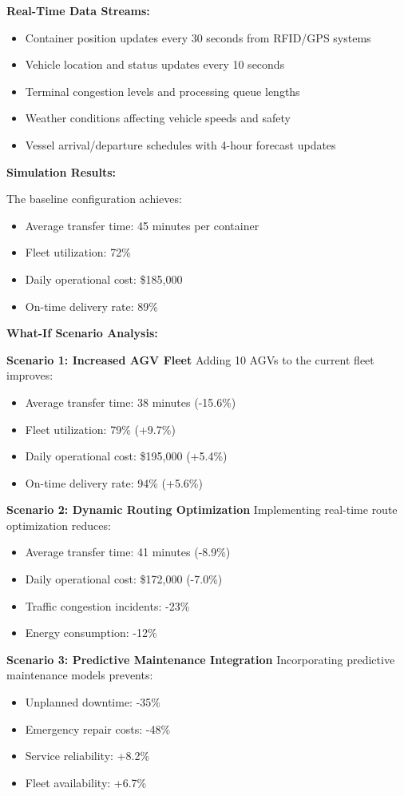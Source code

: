 \documentclass{article}
\begin{document}
\textbf{Real-Time Data Streams:}
\begin{itemize}
\item Container position updates every 30 seconds from RFID/GPS systems
\item Vehicle location and status updates every 10 seconds
\item Terminal congestion levels and processing queue lengths
\item Weather conditions affecting vehicle speeds and safety
\item Vessel arrival/departure schedules with 4-hour forecast updates
\end{itemize}

\textbf{Simulation Results:}

The baseline configuration achieves:
\begin{itemize}
\item Average transfer time: 45 minutes per container
\item Fleet utilization: 72\%
\item Daily operational cost: \$185,000
\item On-time delivery rate: 89\%
\end{itemize}

\textbf{What-If Scenario Analysis:}

\textbf{Scenario 1: Increased AGV Fleet}
Adding 10 AGVs to the current fleet improves:
\begin{itemize}
\item Average transfer time: 38 minutes (-15.6\%)
\item Fleet utilization: 79\% (+9.7\%)
\item Daily operational cost: \$195,000 (+5.4\%)
\item On-time delivery rate: 94\% (+5.6\%)
\end{itemize}

\textbf{Scenario 2: Dynamic Routing Optimization}
Implementing real-time route optimization reduces:
\begin{itemize}
\item Average transfer time: 41 minutes (-8.9\%)
\item Daily operational cost: \$172,000 (-7.0\%)
\item Traffic congestion incidents: -23\%
\item Energy consumption: -12\%
\end{itemize}

\textbf{Scenario 3: Predictive Maintenance Integration}
Incorporating predictive maintenance models prevents:
\begin{itemize}
\item Unplanned downtime: -35\%
\item Emergency repair costs: -48\%
\item Service reliability: +8.2\%
\item Fleet availability: +6.7\%
\end{itemize}
\end{document}
